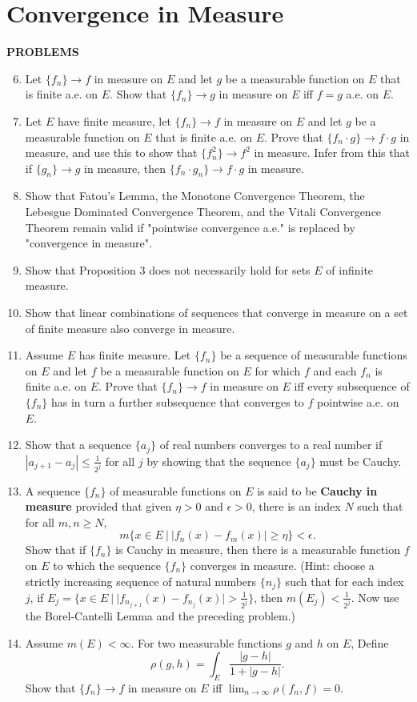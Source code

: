\section{Convergence in Measure}
\begin{center}
	\textbf{PROBLEMS}
\end{center}
\begin{enumerate}
	\setcounter{enumi}{5}
    \item Let $\{f_n\}\to f$ in measure on $E$ and let $g$ be a measurable function on $E$ that is finite a.e. on $E$. 
    Show that $\{f_n\}\to g$ in measure on $E$ iff $f=g$ a.e. on $E$.
    \item Let $E$ have finite measure, let $\{f_n\}\to f$ in measure on $E$ and let $g$ be a measurable function on $E$ that is finite a.e. on $E$.
    Prove that $\{f_n\cdot g\}\to f\cdot g$ in measure, and use this to show that $\{f_n^2\}\to f^2$ in measure.
    Infer from this that if $\{g_n\}\to g$ in measure, then $\{f_n\cdot g_n\}\to f\cdot g$ in measure.
    \item Show that Fatou's Lemma, the Monotone Convergence Theorem, the Lebesgue Dominated Convergence Theorem, and the Vitali Convergence Theorem remain valid if "pointwise convergence a.e." is replaced by "convergence in measure".
    \item Show that Proposition 3 does not necessarily hold for sets $E$ of infinite measure.
    \item Show that linear combinations of sequences that converge in measure on a set of finite measure also converge in measure.
    \item Assume $E$ has finite measure. Let $\{f_n\}$ be a sequence of measurable functions on $E$ and let $f$ be a measurable function on $E$ for which $f$ and each $f_n$ is finite a.e. on $E$.
    Prove that $\{f_n\}\to f$ in measure on $E$ iff every subsequence of $\{f_n\}$ has in turn a further subsequence that converges to $f$ pointwise a.e. on $E$.
    \item Show that a sequence $\{a_j\}$ of real numbers converges to a real number if $|a_{j+1}-a_j|\le\frac{1}{2^j}$ for all $j$ by showing that the sequence $\{a_j\}$ must be Cauchy.
    \item A sequence $\{f_n\}$ of measurable functions on $E$ is said to be \textbf{Cauchy in measure} provided that given $\eta>0$ and $\epsilon>0$, there is an index $N$ such that for all $m,n\ge N$, 
    \[
        m\{x\in E\ |\ |f_n(x)-f_m(x)|\ge\eta\}<\epsilon.  
    \]
    Show that if $\{f_n\}$ is Cauchy in measure, then there is a measurable function $f$ on $E$ to which the sequence $\{f_n\}$ converges in measure.
    (Hint: choose a strictly increasing sequence of natural numbers $\{n_j\}$ such that for each index $j$, if $E_j=\{x\in E\ |\ |f_{n_{j+1}}(x)-f_{n_j}(x)|>\frac{1}{2^j}\}$, then $m(E_j)<\frac{1}{2^j}$. Now use the Borel-Cantelli Lemma and the preceding problem.)
    \item Assume $m(E)<\infty$. For two measurable functions $g$ and $h$ on $E$, Define
    \[
        \rho(g,h)=\int_E\frac{|g-h|}{1+|g-h|}.
    \]
    Show that $\{f_n\}\to f$ in measure on $E$ iff $\lim_{n\to\infty}\rho(f_n,f)=0$.
\end{enumerate}

